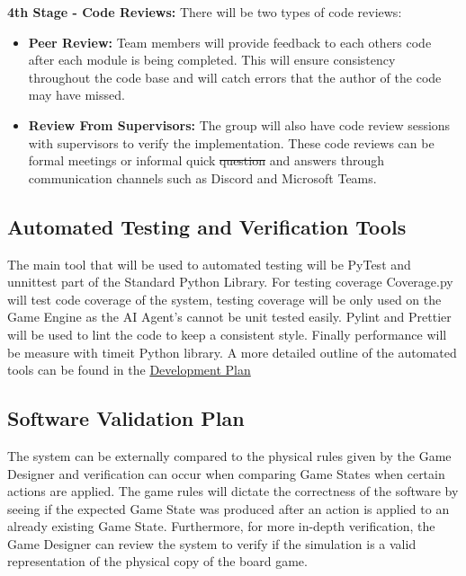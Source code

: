 \documentclass[12pt, titlepage]{article}
\providecommand{\DIFaddtex}[1]{{\protect\color{blue}\uwave{#1}}} %
\providecommand{\DIFdeltex}[1]{{\protect\color{red}\sout{#1}}}                      %
\providecommand{\DIFaddbegin}{} %
\providecommand{\DIFaddend}{} %
\providecommand{\DIFdelbegin}{} %
\providecommand{\DIFdelend}{} %
\providecommand{\DIFadd}[1]{\texorpdfstring{\DIFaddtex{#1}}{#1}} %
\providecommand{\DIFdel}[1]{\texorpdfstring{\DIFdeltex{#1}}{}} %
\newcommand{\DIFscaledelfig}{0.5}
\newlength{\DIFdelgraphicswidth} %
\newlength{\DIFdelgraphicsheight} %
\newcommand{\DIFaddincludegraphics}[2][]{{\color{blue}\fbox{\DIFOincludegraphics[#1]{#2}}}} %
\newcommand{\DIFdelincludegraphics}[2][]{%
\sbox{\DIFdelgraphicsbox}{\DIFOincludegraphics[#1]{#2}}%
\settoboxwidth{\DIFdelgraphicswidth}{\DIFdelgraphicsbox} %
\settoboxtotalheight{\DIFdelgraphicsheight}{\DIFdelgraphicsbox} %
\scalebox{\DIFscaledelfig}{%
\parbox[b]{\DIFdelgraphicswidth}{\usebox{\DIFdelgraphicsbox}\\[-\baselineskip] \rule{\DIFdelgraphicswidth}{0em}}\llap{\resizebox{\DIFdelgraphicswidth}{\DIFdelgraphicsheight}{%
\setlength{\unitlength}{\DIFdelgraphicswidth}%
\begin{picture}(1,1)%
\thicklines\linethickness{2pt} %
{\color[rgb]{1,0,0}\put(0,0){\framebox(1,1){}}}%
{\color[rgb]{1,0,0}\put(0,0){\line( 1,1){1}}}%
{\color[rgb]{1,0,0}\put(0,1){\line(1,-1){1}}}%
\end{picture}%
}\hspace*{3pt}}} %
} %
\DeclareRobustCommand{\DIFaddbegin}{\DIFOaddbegin \let\includegraphics\DIFaddincludegraphics} %
\DeclareRobustCommand{\DIFaddend}{\DIFOaddend \let\includegraphics\DIFOincludegraphics} %
\DeclareRobustCommand{\DIFdelbegin}{\DIFOdelbegin \let\includegraphics\DIFdelincludegraphics} %
\DeclareRobustCommand{\DIFdelend}{\DIFOaddend \let\includegraphics\DIFOincludegraphics} %
\begin{document}
\textbf{4th Stage - Code Reviews:} There will be two types of code reviews:
\begin{itemize}
    \item \textbf{Peer Review:} Team members will provide feedback to each others code after each module is being completed. This will ensure consistency throughout the code base and will catch errors that the author of the code may have missed.
    \item \textbf{Review From Supervisors:} The group will also have code review sessions with supervisors to verify the implementation. These code reviews can be formal meetings or informal quick \DIFdelbegin \DIFdel{question }\DIFdelend \DIFaddbegin \DIFadd{questions }\DIFaddend and answers through communication channels such as Discord and Microsoft Teams.
\end{itemize}


\subsection{Automated Testing and Verification Tools}
The main tool that will be used to automated testing will be PyTest and unnittest part of the Standard Python Library. For testing coverage Coverage.py will test code coverage of the system, testing coverage will be only used on the Game Engine as the AI Agent's cannot be unit tested easily. Pylint and Prettier will be used to lint the code to keep a consistent style. Finally performance will be measure with timeit Python library. A more detailed outline of the automated tools can be found in the \href{https://github.com/Dorps/aiboardgame/blob/main/docs/DevelopmentPlan/DevelopmentPlan.pdf}{Development Plan} 


\subsection{Software Validation Plan}

 The system can be externally compared to the physical rules given by the Game Designer and verification can occur when comparing Game States when certain actions are applied. The game rules will dictate the correctness of the software by seeing if the expected Game State was produced after an action is applied to an already existing Game State. Furthermore, for more in-depth verification, the Game Designer can review the system to verify if the simulation is a valid representation of the physical copy of the board game.
\end{document}
